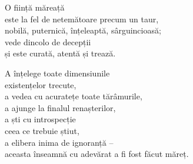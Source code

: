 O ființă măreață\\
este la fel de netemătoare precum un taur,\\
nobilă, puternică, înțeleaptă, sârguincioasă;\\
vede dincolo de decepții\\
și este curată, atentă și trează.


A înțelege toate dimensiunile\\
existențelor trecute,\\
a vedea cu acuratețe toate tărâmurile,\\
a ajunge la finalul renașterilor,\\
a ști cu introspecție\\
ceea ce trebuie știut,\\
a elibera inima de ignoranță –\\
aceasta înseamnă cu adevărat a fi fost făcut măreț.
